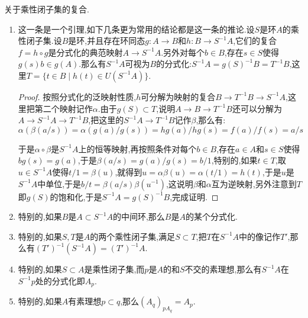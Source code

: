 关于乘性闭子集的复合.
\begin{enumerate}
	\item 这一条是一个引理,如下几条更为常用的结论都是这一条的推论.设$S$是环$A$的乘性闭子集.设$B$是环,并且存在环同态$g:A\to B$和$h:B\to S^{-1}A$,它们的复合$f=h\circ g$是分式化的典范映射$A\to S^{-1}A$.另外对每个$b\in B$,存在$s\in S$使得$g(s)b\in g(A)$.那么有$S^{-1}A$可视为$B$的分式化:$S^{-1}A=g(S)^{-1}B=T^{-1}B$,这里$T=\{t\in B\mid h(t)\in U(S^{-1}A)\}$.
	\begin{proof}
		
		按照分式化的泛映射性质,$h$可分解为映射的复合$B\to T^{-1}B\to S^{-1}A$,这里把第二个映射记作$\alpha$.由于$g(S)\subset T$,说明$A\to B\to T^{-1}B$还可以分解为$A\to S^{-1}A\to T^{-1}B$,把这里的$S^{-1}A\to T^{-1}B$记作$\beta$,那么有:
		$$\alpha(\beta(a/s))=\alpha(g(a)/g(s))=hg(a)/hg(s)=f(a)/f(s)=a/s$$
		
		于是$\alpha\circ\beta$是$S^{-1}A$上的恒等映射,再按照条件对每个$b\in B$,存在$a\in A$和$s\in S$使得$bg(s)=g(a)$,于是$\beta(a/s)=g(a)/g(s)=b/1$,特别的,如果$t\in T$,取$u\in S^{-1}A$使得$t/1=\beta(u)$,就得到$u=\alpha\beta(u)=\alpha(t/1)=h(t)$,于是$u$是$S^{-1}A$中单位,于是$b/t=\beta(a/s)\beta(u^{-1})$,这说明$\beta$和$\alpha$互为逆映射,另外注意到$T$即$g(S)$的饱和化,于是$S^{-1}A=g(S)^{-1}B$,完成证明.
	\end{proof}
    \item 特别的,如果$B$是$A\subset S^{-1}A$的中间环,那么$B$是$A$的某个分式化.
    \item 特别的,如果$S,T$是$A$的两个乘性闭子集,满足$S\subset T$,把$T$在$S^{-1}A$中的像记作$T'$,那么有$(T')^{-1}(S^{-1}A)=(T')^{-1}A$.
    \item 特别的,如果$S\subset A$是乘性闭子集,而$p$是$A$的和$S$不交的素理想,那么有$S^{-1}A$在$S^{-1}p$处的分式化即$A_p$.
    \item 特别的,如果$A$有素理想$p\subset q$,那么$(A_q)_{pA_q}=A_p$.
\end{enumerate}

